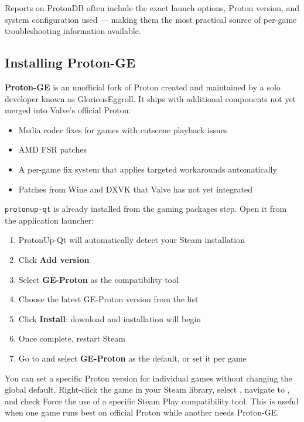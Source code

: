 \documentclass{article}
\newcommand{\code}[1]{\colorbox{codebg}{\texttt{#1}}}
\begin{document}
\noindent Reports on ProtonDB often include the exact launch options, Proton
version, and system configuration used --- making them the most practical
source of per-game troubleshooting information available.

\subsection{Installing Proton-GE}

\textbf{Proton-GE} is an unofficial fork of Proton created and maintained by
a solo developer known as GloriousEggroll. It ships with additional components
not yet merged into Valve's official Proton:

\begin{itemize}[leftmargin=1.5em, nosep, label={\tiny\textbullet}]
	\item Media codec fixes for games with cutscene playback issues
	\item AMD FSR patches
	\item A per-game fix system that applies targeted workarounds automatically
	\item Patches from Wine and DXVK that Valve has not yet integrated
\end{itemize}

\noindent \code{protonup-qt} is already installed from the gaming packages
step. Open it from the application launcher:

\begin{enumerate}[leftmargin=1.5em, nosep, label={\arabic*.}]
	\item ProtonUp-Qt will automatically detect your Steam installation
	\item Click \textbf{Add version}
	\item Select \textbf{GE-Proton} as the compatibility tool
	\item Choose the latest GE-Proton version from the list
	\item Click \textbf{Install}: download and installation will begin
	\item Once complete, restart Steam
	\item Go to  and select
	\textbf{GE-Proton} as the default, or set it per game
\end{enumerate}

\begin{tcolorbox}[arc=12pt, outer arc=10pt,
	colback=blue!4!white, colframe=blue!40!black,
	title=\textbf{Per-Game Proton Version}]
	You can set a specific Proton version for individual games without changing
	the global default. Right-click the game in your Steam library, select
	, navigate to , and check Force the use of a specific Steam Play compatibility tool. This
	is useful when one game runs best on official Proton while another needs
	Proton-GE.
\end{tcolorbox}
\end{document}
